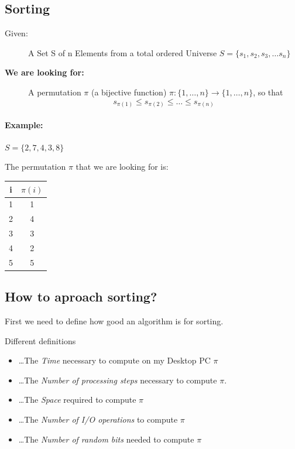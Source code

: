 \subsection{Sorting}

\begin{description}
\item[Given: ] A Set S of n Elements from a total ordered Universe
	$S=\{s_1, s_2, s_3, \dots s_n\}$
\item[\bf We are looking for:] A permutation $\pi$ (a bijective function) 
	$\pi:\{1,\dots,n\}\rightarrow\{1,\dots,n\}$, so that
	\[
		s_{\pi(1)}\leq s_{\pi(2)}\leq \dots \leq s_{\pi(n)}
	\]
\end{description}




\paragraph{Example:}
$S=\{2,7,4,3,8\}$

The permutation $\pi$ that we are looking for is:
\hspace{2cm}
\begin{tabular}{c|c}
i & $\pi(i)$	\\
\hline
1 & 1\\
2 & 4\\
3 & 3\\
4 & 2\\
5 & 5\\
\end{tabular}

\subsection{How to aproach sorting?}
First we need to define how good an algorithm is for sorting.

Different definitions
\begin{itemize}
\item \dots The \emph{Time} necessary to compute on my Desktop PC $\pi$ 
\item \dots The \emph{Number of processing steps} necessary to compute $\pi$.
\item \dots The \emph{Space} required to compute $\pi$
\item \dots The \emph{Number of I/O operations} to compute $\pi$
\item \dots The \emph{Number of random bits} needed to compute $\pi$
\end{itemize}

